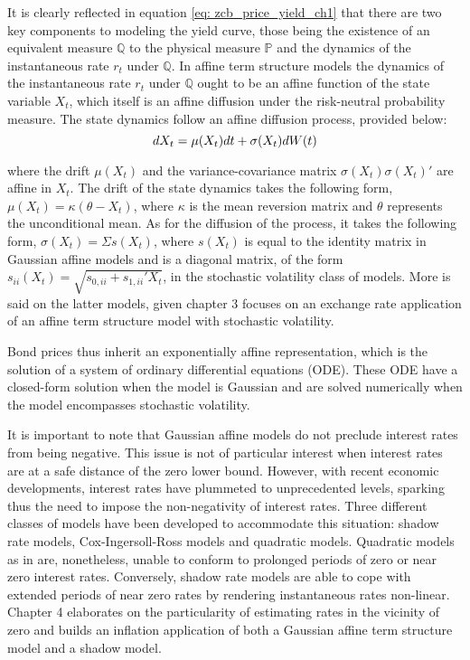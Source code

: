 It is clearly reflected in equation \ref{eq: zcb_price_yield_ch1} that there are two key components to modeling the yield curve, those being the existence of an equivalent measure \(\mathbb{Q}\) to the physical measure \(\mathbb{P}\) and the dynamics of the instantaneous rate \(r_t\) under \(\mathbb{Q}\).
In affine term structure models the dynamics of the instantaneous rate \(r_t\) under \(\mathbb{Q}\) ought to be an affine function of the state variable \(X_t\), which itself is an affine diffusion under the risk-neutral probability measure. The state dynamics follow an affine diffusion process, provided below: 
\begin{equation}
dX_t=\mu(X_t)dt+\sigma(X_t)dW(t) \label{eq: state_ch1}\\
\end{equation}  

where the drift \(\mu(X_t)\) and the variance-covariance matrix \(\sigma(X_t)\sigma(X_t)'\) are affine in \(X_t\).
The drift of the state dynamics takes the following form, \(\mu(X_t)=\kappa(\theta-X_t)\), where \(\kappa\) is the mean reversion matrix and \(\theta\) represents the unconditional mean. As for the diffusion of the process, it takes the following form, \(\sigma(X_t)=\Sigma s(X_t)\), where \(s(X_t)\) is equal to the identity matrix in Gaussian affine models and is a diagonal matrix, of the form \(s_{ii}(X_t)=\sqrt{s_{0,ii}+s_{1,ii}'X_t}\), in the stochastic volatility class of models. More is said on the latter models, given chapter 3 focuses on an exchange rate application of an affine term structure model with stochastic volatility.

Bond prices thus inherit an exponentially affine representation, which is the solution of a system of ordinary differential equations (ODE). These ODE have a closed-form solution when the model is Gaussian and are solved numerically when the model encompasses stochastic volatility.  

It is important to note that Gaussian affine models do not preclude interest rates from being negative. This issue is not of particular interest when interest rates are at a safe distance of the zero lower bound. However, with recent economic developments, interest rates have plummeted to unprecedented levels, sparking thus the need to impose the non-negativity of interest rates. Three different classes of models have been developed to accommodate this situation: shadow rate models, Cox-Ingersoll-Ross models and quadratic models. Quadratic models as in \cite{ahn_2002} are, nonetheless, unable to conform to prolonged periods of zero or near zero interest rates. Conversely, shadow rate models are able to cope with extended periods of near zero rates by rendering instantaneous rates non-linear. Chapter 4 elaborates on the particularity of estimating rates in the vicinity of zero and builds an inflation application of both a Gaussian affine term structure model and a shadow model.

